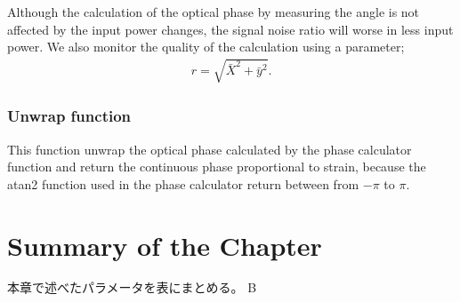 Although the calculation of the optical phase by measuring the angle is not affected by the input power changes, the signal noise ratio will worse in less input power. We also monitor the quality of the calculation using a parameter;
\begin{eqnarray}
  r = \sqrt{\bar{X}^2+{\bar{y}^2}}.
\end{eqnarray}

\subsubsection{Unwrap function}
This function unwrap the optical phase calculated by the phase calculator function and return the continuous phase proportional to strain, because the atan2 function used in the phase calculator return between from $-\pi$ to $\pi$. 

\section{Summary of the Chapter} %
本章で述べたパラメータを表にまとめる。
B
